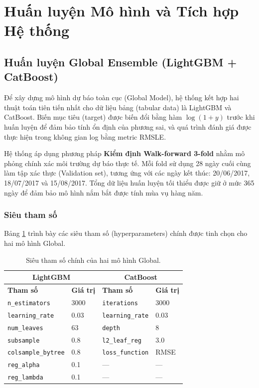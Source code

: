\documentclass[12pt,a4paper]{report}
\begin{document}
\section{Huấn luyện Mô hình và Tích hợp Hệ thống}

\subsection{Huấn luyện Global Ensemble (LightGBM + CatBoost)}
Để xây dựng mô hình dự báo toàn cục (Global Model), hệ thống kết hợp hai thuật toán tiên tiến nhất cho dữ liệu bảng (tabular data) là LightGBM và CatBoost. Biến mục tiêu (target) được biến đổi bằng hàm $\log(1 + y)$ trước khi huấn luyện để đảm bảo tính ổn định của phương sai, và quá trình đánh giá được thực hiện trong không gian log bằng metric RMSLE.

Hệ thống áp dụng phương pháp \textbf{Kiểm định Walk-forward 3-fold} nhằm mô phỏng chính xác môi trường dự báo thực tế. Mỗi fold sử dụng 28 ngày cuối cùng làm tập xác thực (Validation set), tương ứng với các ngày kết thúc: 20/06/2017, 18/07/2017 và 15/08/2017. Tổng dữ liệu huấn luyện tối thiểu được giữ ở mức 365 ngày để đảm bảo mô hình nắm bắt được tính mùa vụ hàng năm.

\subsubsection{Siêu tham số}
Bảng \ref{tab:hyperparams} trình bày các siêu tham số (hyperparameters) chính được tinh chọn cho hai mô hình Global.

\begin{table}[H]
    \centering
    \caption{Siêu tham số chính của hai mô hình Global.}
    \label{tab:hyperparams}
    \renewcommand{\arraystretch}{1.3}
    \begin{tabular}{|l|l||l|l|}
        \hline
        \multicolumn{2}{|c||}{\textbf{LightGBM}} & \multicolumn{2}{c|}{\textbf{CatBoost}} \\
        \hline
        \textbf{Tham số} & \textbf{Giá trị} & \textbf{Tham số} & \textbf{Giá trị} \\
        \hline
        \texttt{n\_estimators} & 3000 & \texttt{iterations} & 3000 \\
        \texttt{learning\_rate} & 0.03 & \texttt{learning\_rate} & 0.03 \\
        \texttt{num\_leaves} & 63 & \texttt{depth} & 8 \\
        \texttt{subsample} & 0.8 & \texttt{l2\_leaf\_reg} & 3.0 \\
        \texttt{colsample\_bytree} & 0.8 & \texttt{loss\_function} & RMSE \\
        \texttt{reg\_alpha} & 0.1 & — & — \\
        \texttt{reg\_lambda} & 0.1 & — & — \\
        \hline
    \end{tabular}
\end{table}
\end{document}
